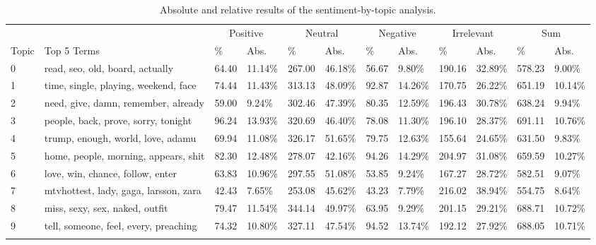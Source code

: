 \begin{table}
    \caption{Absolute and relative results of the sentiment-by-topic analysis.}
    \label{tab:combination}
    \begin{tabular}{l l l l l l l l l l l l} %
        \toprule
        & &
        \multicolumn{2}{c}{Positive}&
        \multicolumn{2}{c}{Neutral}&
        \multicolumn{2}{c}{Negative}&
        \multicolumn{2}{c}{Irrelevant}&
        \multicolumn{2}{c}{Sum}
        \\\cmidrule{3-12}
        Topic & Top 5 Terms
        & \%
        & Abs.
        & \%
        & Abs.
        & \%
        & Abs.
        & \%
        & Abs.
        & \%
        & Abs.
        \\\midrule
        0 & read, seo, old, board, actually & 64.40 & 11.14\% & 267.00 & 46.18\% & 56.67 & 9.80\% & 190.16 & 32.89\% & 578.23 & 9.00\% \\\midrule
        1 & time, single, playing, weekend, face & 74.44 & 11.43\% & 313.13 & 48.09\% & 92.87 & 14.26\% & 170.75 & 26.22\% & 651.19 & 10.14\% \\\midrule
        2 & need, give, damn, remember, already & 59.00 & 9.24\% & 302.46 & 47.39\% & 80.35 & 12.59\% & 196.43 & 30.78\% & 638.24 & 9.94\% \\\midrule
        3 & people, back, prove, sorry, tonight & 96.24 & 13.93\% & 320.69 & 46.40\% & 78.08 & 11.30\% & 196.10 & 28.37\% & 691.11 & 10.76\% \\\midrule
        4 & trump, enough, world, love, adamu & 69.94 & 11.08\% & 326.17 & 51.65\% & 79.75 & 12.63\% & 155.64 & 24.65\% & 631.50 & 9.83\% \\\midrule
        5 & home, people, morning, appears, shit & 82.30 & 12.48\% & 278.07 & 42.16\% & 94.26 & 14.29\% & 204.97 & 31.08\% & 659.59 & 10.27\% \\\midrule
        6 & love, win, chance, follow, enter & 63.83 & 10.96\% & 297.55 & 51.08\% & 53.85 & 9.24\% & 167.27 & 28.72\% & 582.51 & 9.07\% \\\midrule
        7 & mtvhottest, lady, gaga, larsson, zara & 42.43 & 7.65\% & 253.08 & 45.62\% & 43.23 & 7.79\% & 216.02 & 38.94\% & 554.75 & 8.64\% \\\midrule
        8 & miss, sexy, sex, naked, outfit & 79.47 & 11.54\% & 344.14 & 49.97\% & 63.95 & 9.29\% & 201.15 & 29.21\% & 688.71 & 10.72\% \\\midrule
        9 & tell, someone, feel, every, preaching & 74.32 & 10.80\% & 327.11 & 47.54\% & 94.52 & 13.74\% & 192.12 & 27.92\% & 688.05 & 10.71\% \\\midrule
        \\\bottomrule
    \end{tabular}
\end{table}

